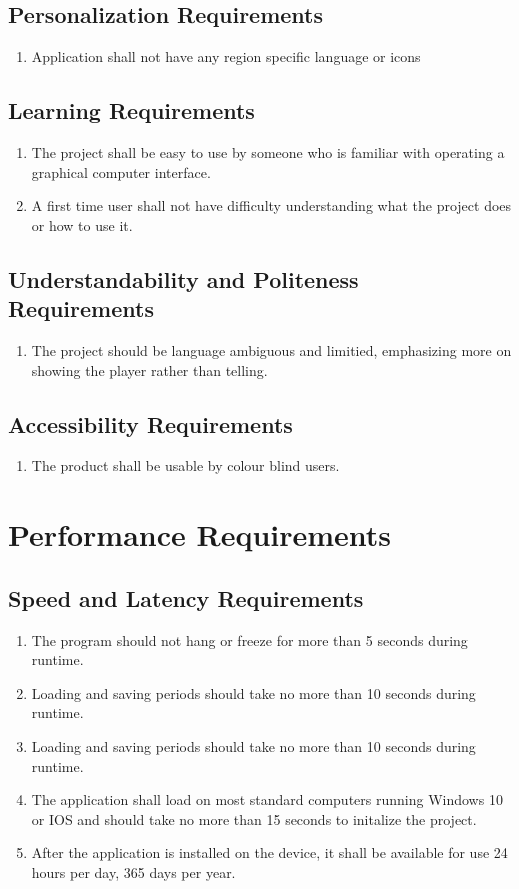 \documentclass{article}
\begin{document}
\subsection{Personalization Requirements}
\begin{enumerate}[{PR}1. ]
	\item Application shall not have any region specific language or icons
\end{enumerate}
\subsection{Learning Requirements}
\begin{enumerate}[{LR}1. ]
	\item The project shall be easy to use by someone who is familiar with operating a graphical computer interface.
	\item A first time user shall not have difficulty understanding what the project does or how to use it.
\end{enumerate}
\subsection{Understandability and Politeness Requirements}
\begin{enumerate}[{UPR}1. ]
	\item The project should be language ambiguous and limitied, emphasizing more on showing the player rather than telling.
\end{enumerate}
\subsection{Accessibility Requirements}
\begin{enumerate}[{AR}1. ]
	\item The product shall be usable by colour blind users.
\end{enumerate}
\section{Performance Requirements}
\subsection{Speed and Latency Requirements}
\begin{enumerate}[{SLR}1. ]
	\item The program should not hang or freeze for more than 5 seconds during runtime.
	\item Loading and saving periods should take no more than 10 seconds during runtime.
	\item Loading and saving periods should take no more than 10 seconds during runtime.
	\item The application shall load on most standard computers running Windows 10 or IOS and should take no more than 15 seconds to initalize the project.
	\item After the application is installed on the device, it shall be available for use 24 hours per day, 365 days per year.
\end{enumerate}
\end{document}
